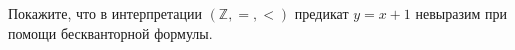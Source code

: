 Покажите, что в интерпретации $(\mathbb{Z}, =, <)$ предикат $y = x + 1$ невыразим при помощи
бескванторной формулы.
